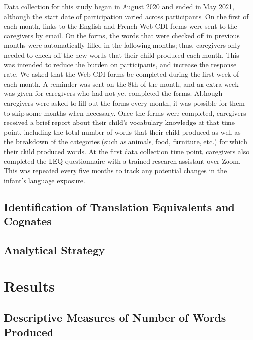 \documentclass[
  english,
  ,man,floatsintext]{apa6}
\begin{document}
Data collection for this study began in August 2020 and ended in May 2021, although the start date of participation varied across participants. On the first of each month, links to the English and French Web-CDI forms were sent to the caregivers by email. On the forms, the words that were checked off in previous months were automatically filled in the following months; thus, caregivers only needed to check off the new words that their child produced each month. This was intended to reduce the burden on participants, and increase the response rate. We asked that the Web-CDI forms be completed during the first week of each month. A reminder was sent on the 8th of the month, and an extra week was given for caregivers who had not yet completed the forms. Although caregivers were asked to fill out the forms every month, it was possible for them to skip some months when necessary. Once the forms were completed, caregivers received a brief report about their child's vocabulary knowledge at that time point, including the total number of words that their child produced as well as the breakdown of the categories (such as animals, food, furniture, etc.) for which their child produced words.
At the first data collection time point, caregivers also completed the LEQ questionnaire with a trained research assistant over Zoom. This was repeated every five months to track any potential changes in the infant's language exposure.

\hypertarget{identification-of-translation-equivalents-and-cognates}{%
\subsection{Identification of Translation Equivalents and Cognates}\label{identification-of-translation-equivalents-and-cognates}}

\hypertarget{analytical-strategy}{%
\subsection{Analytical Strategy}\label{analytical-strategy}}

\hypertarget{results}{%
\section{Results}\label{results}}

\hypertarget{descriptive-measures-of-number-of-words-produced}{%
\subsection{Descriptive Measures of Number of Words Produced}\label{descriptive-measures-of-number-of-words-produced}}
\end{document}
